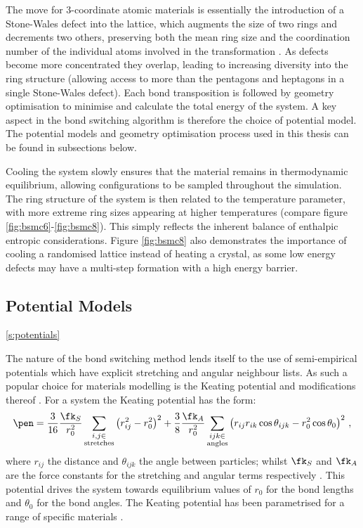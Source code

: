 The \mc{} move for 3\--coordinate atomic materials is essentially the introduction of a Stone\--Wales defect into the lattice, which
augments the size of two rings and decrements two others, preserving both the mean ring size and the coordination number of the individual atoms involved in the transformation \cite{Stone1986}.
As defects become more concentrated they overlap, leading to increasing diversity into the ring structure (allowing access to more than the pentagons and heptagons in a single Stone\--Wales defect).
Each bond transposition is followed by geometry optimisation to minimise and calculate the total energy of the system.  
A key aspect in the bond switching algorithm is therefore the choice of potential model.
The potential models and geometry optimisation process used in this thesis can be found in subsections below.

Cooling the system slowly ensures that the material remains in thermodynamic equilibrium, allowing configurations to be sampled throughout the simulation.
The ring structure of the system is then related to the temperature parameter, with more extreme ring sizes appearing at higher temperatures (compare figure \ref{fig:bsmc6}\--\ref{fig:bsmc8}).
This simply reflects the inherent balance of enthalpic \vs{} entropic  considerations.
Figure \ref{fig:bsmc8} also demonstrates the importance of cooling a randomised lattice instead of heating a crystal, as some low energy defects may have a multi\--step formation with a high energy barrier.  

\subsection{Potential Models}
\ref{s:potentials}

The nature of the bond switching method lends itself to the use of semi\--empirical potentials which have explicit stretching and angular neighbour lists.
As such a popular choice for materials modelling is the Keating potential and modifications thereof \cite{Keating1966,Barkema2000}. 
For a \td{} system the Keating potential has the form:
\begin{equation}
	\label{eq:keating}
	\pen = \frac{3}{16}\frac{\fk_S}{r_0^2}\sum_{\substack{i,j \in \\ \text{stretches}}} \left(r_{ij}^2-r_0^2\right)^2+
	\frac{3}{8}\frac{\fk_A}{r_0^2}\sum_{\substack{ijk \in \\ \text{angles}}}\left(r_{ij}r_{ik}\cos\theta_{ijk}-r_0^2\cos\theta_0\right)^2 \,,
\end{equation}
where $r_{ij}$ the distance and $\theta_{ijk}$ the angle between particles; whilst $\fk_S$ and $\fk_A$ are the force constants for the stretching and angular terms respectively \cite{Kumar2012}.
This potential drives the system towards equilibrium values of $r_0$ for the bond lengths and $\theta_0$ for the bond angles.
The Keating potential has been parametrised for a range of specific materials \cite{Kumar2012,Drabold2009}. 

